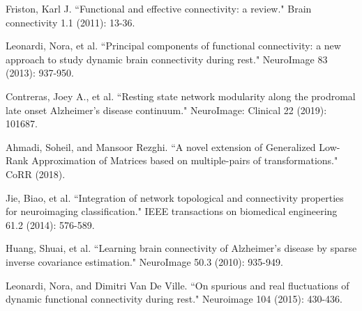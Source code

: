 \begin{thebibliography}{1}
		
			Friston, Karl J. ``Functional and effective connectivity: a review." Brain connectivity 1.1 (2011): 13-36.
			
			
		Leonardi, Nora, et al. ``Principal components of functional connectivity: a new approach to study dynamic brain connectivity during rest." NeuroImage 83 (2013): 937-950.
	
	
	Contreras, Joey A., et al. ``Resting state network modularity along the prodromal late onset Alzheimer's disease continuum." NeuroImage: Clinical 22 (2019): 101687.
	
	
	Ahmadi, Soheil, and Mansoor Rezghi. ``A novel extension of Generalized Low-Rank Approximation of Matrices based on multiple-pairs of transformations." CoRR (2018).
	
	
	
	Jie, Biao, et al. ``Integration of network topological and connectivity properties for neuroimaging classification." IEEE transactions on biomedical engineering 61.2 (2014): 576-589.
	
	
	
	Huang, Shuai, et al. ``Learning brain connectivity of Alzheimer's disease by sparse inverse covariance estimation." NeuroImage 50.3 (2010): 935-949.
	
	
	Leonardi, Nora, and Dimitri Van De Ville. ``On spurious and real fluctuations of dynamic functional connectivity during rest." Neuroimage 104 (2015): 430-436.
	
	
	

\end{thebibliography}
